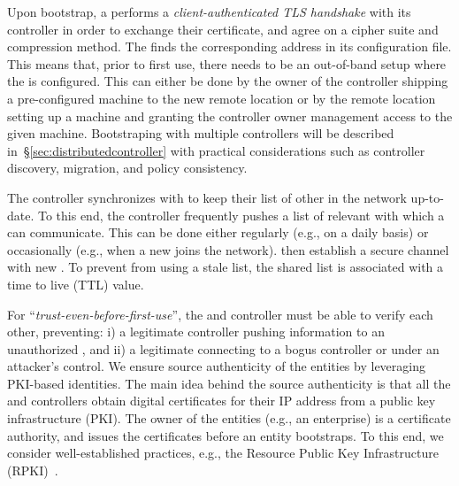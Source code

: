 Upon bootstrap, a \tp performs a \textit{client-authenticated TLS handshake} with its 
controller in order to exchange their certificate, and agree on a cipher suite and compression
method. The \tp finds the corresponding address in its configuration file. This means 
that, prior to first use, there needs to be an out-of-band setup where the \tp is 
configured. This can either be done by the owner of the controller shipping a pre-configured 
machine to the new remote location or by the remote location setting up a machine and 
granting the controller owner management access to the given machine. Bootstraping \tps 
with multiple controllers will be described in~\S\ref{sec:distributedcontroller} with
practical considerations such as controller discovery, \tp migration, and policy consistency.

The controller synchronizes with \tps to keep their list of other \tps in the network 
up-to-date. To this end, the controller frequently pushes a list of relevant \tps with 
which a \tp can communicate.
This can be done either regularly (e.g., on a daily basis) or occasionally
(e.g., when a new \tp joins the network).
\tps then establish a secure channel with new \tps. To prevent \tps from using a stale \tp list,
the shared \tp list is associated with a time to live (TTL) value. 

For ``\textit{trust-even-before-first-use}'', 
the \tps and controller must be able to verify each 
other, preventing: i) a legitimate controller pushing information to an unauthorized \tp, 
and ii) a legitimate \tp connecting to a bogus controller or \tp under an attacker's control.
We ensure source authenticity of the \name entities by leveraging PKI-based identities.
The main idea behind the source authenticity is that all the \tps and controllers obtain
digital certificates for their IP address from a public key infrastructure (PKI). The owner 
of the entities (e.g., an enterprise) is a certificate authority, and issues the certificates
before an entity bootstraps. To this end, we consider well-established practices, e.g.,
the Resource Public Key Infrastructure (RPKI)~\cite{rfc7115,rfc6810}.

